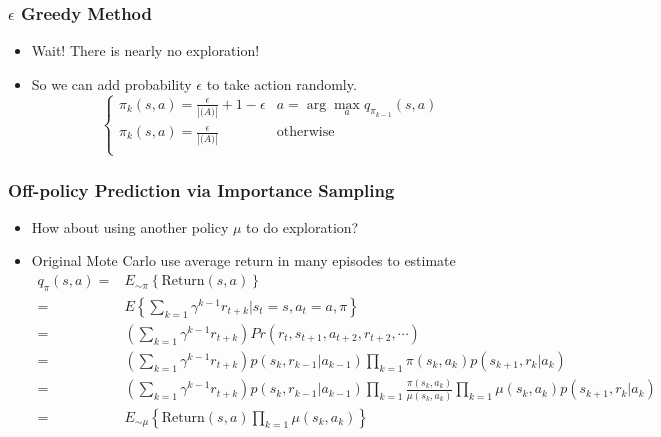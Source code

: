 \begin{frame}
  \frametitle{$\epsilon$ Greedy Method}
  \begin{itemize}
  \item Wait! There is nearly no exploration!
  \item So we can add probability $\epsilon$ to take action randomly.
    \begin{equation*}
      \begin{cases}
        \pi_k(s, a) = \frac{\epsilon}{|\mathcal(A)|} + 1 - \epsilon & a = \arg \max_a \hat{q}_{\pi_{k-1}}(s, a) \\
        \pi_k(s, a) = \frac{\epsilon}{|\mathcal(A)|} & \text{otherwise}\\
      \end{cases}
    \end{equation*}
  \end{itemize}
\end{frame}


\begin{frame}
  \frametitle{Off-policy Prediction via Importance Sampling}
  \begin{itemize}
  \item How about using another policy $\mu$ to do exploration?
  \item Original Mote Carlo use average return in many episodes to estimate
    {
      \tiny
      \begin{align*}
        q_\pi(s, a)
        =& E_{\sim\pi} \left\{ \mathrm{Return}(s, a) \right\} \\
        =& E \left\{\sum_{k=1} \gamma^{k-1} r_{t+k} | s_t = s, a_t = a, \pi \right\} \\
        =& (\sum_{k=1} \gamma^{k-1} r_{t+k}) Pr(r_t, s_{t+1}, a_{t+2}, r_{t+2}, \cdots) \\
        =& (\sum_{k=1} \gamma^{k-1} r_{t+k}) 
           p(s_k, r_{k-1}| a_{k-1}) \prod_{k=1} \pi(s_k, a_k) p(s_{k+1}, r_{k}| a_{k}) \\
        =& (\sum_{k=1} \gamma^{k-1} r_{t+k}) 
           p(s_k, r_{k-1}| a_{k-1}) \prod_{k=1}\frac{\pi(s_k, a_k)}{\mu(s_k, a_k)} \prod_{k=1} \mu(s_k, a_k) p(s_{k+1}, r_{k}| a_{k})  \\
        =& E_{\sim \mu} \left\{ \mathrm{Return}(s, a) \prod_{k=1} \mu(s_k, a_k) \right\} \\
      \end{align*}      
    }%
  \end{itemize}
\end{frame}


